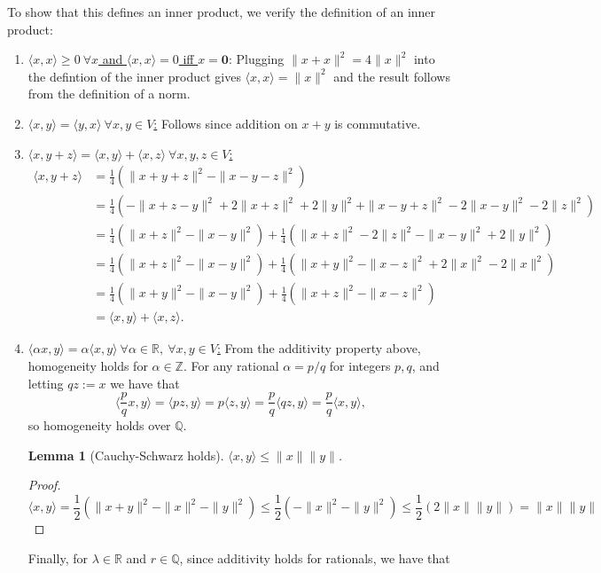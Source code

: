 \documentclass[11pt,letterpaper]{article}
\newtheorem{lemma}[theorem]{Lemma}
\theoremstyle{definition}
\newcommand{\reals}{\mathbb{R}}
\begin{document}
To show that this defines an inner product, we verify the definition of an inner product:
\begin{enumerate} 
    \item \ul{$\langle x,x\rangle\geq 0\ \forall x$ and $\langle x,x\rangle = 0 $ iff $x=\mathbf{0}$}: Plugging $\|x+x\|^2 = 4\|x\|^2$ into the defintion of the inner product gives $\langle x,x\rangle = \|x\|^2$ and the result follows from the definition of a norm. 
    \item \ul{$\langle x,y\rangle = \langle y,x\rangle\ \forall x,y\in V$:} Follows since addition on $x+y$ is commutative.
    \item \ul{$\langle x, y+z\rangle = \langle x,y\rangle + \langle x,z\rangle \ \forall x,y,z\in V$:}
    \begin{align*}
        \langle x,y+z\rangle &= \frac{1}{4}(\|x+y+z\|^2 - \|x-y-z\|^2)\\
        &= \frac{1}{4}(-\|x+z-y\|^2 + 2\|x+z\|^2+2\|y\|^2 + \|x-y+z\|^2 - 2\|x-y\|^2-2\|z\|^2)\\
        &=\frac{1}{4}(\|x+z\|^2-\|x-y\|^2) + \frac{1}{4}(\|x+z\|^2-2\|z\|^2 -\|x-y\|^2+2\|y\|^2) \\
        &=\frac{1}{4}(\|x+z\|^2-\|x-y\|^2) + \frac{1}{4}(\|x+y\|^2-\|x-z\|^2 +2\|x\|^2-2\|x\|^2) \\
        &=\frac{1}{4}(\|x+y\|^2-\|x-y\|^2) + \frac{1}{4}(\|x+z\|^2-\|x-z\|^2) \\
        &=\langle x,y\rangle + \langle x,z\rangle.
    \end{align*}
    \item \ul{$\langle \alpha x,y\rangle = \alpha\langle x,y\rangle\ \forall \alpha\in \reals,\ \forall x,y\in V$:}
    From the additivity property above, homogeneity holds for $\alpha \in \mathbb{Z}$. For any rational $\alpha = p/q$ for integers $p,q$, and letting $qz := x$ we have that
    \[
        \langle \frac{p}{q} x,y\rangle = \langle p z, y\rangle = p\langle z,y\rangle  = \frac{p}{q}\langle qz,y\rangle = \frac{p}{q}\langle x,y\rangle,
    \]
    so homogeneity holds over $\mathbb{Q}$.
    \begin{lemma} [Cauchy-Schwarz holds]
        $\langle x,y\rangle \leq \|x\|\|y\|$.
    \end{lemma}
    \begin{proof}
        \[\langle x,y\rangle = \frac{1}{2}\left(\|x+y\|^2 - \|x\|^2 - \|y\|^2\right) \leq \frac{1}{2}\left(- \|x\|^2 - \|y\|^2\right) \leq \frac{1}{2}(2\|x\|\|y\|) = \|x\|\|y\|\]
    \end{proof}
    Finally, for $\lambda\in \reals$ and $r\in \mathbb{Q}$, since additivity holds for rationals, we have that 

\end{enumerate}
\end{document}
